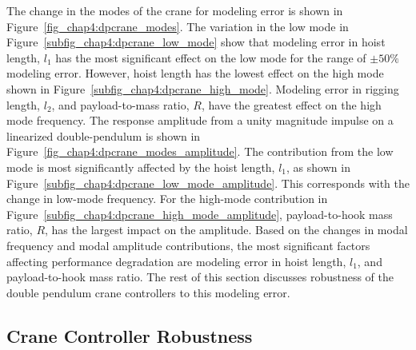The change in the modes of the crane for modeling error is shown in Figure~\ref{fig_chap4:dpcrane_modes}. The variation in the low mode in Figure~\ref{subfig_chap4:dpcrane_low_mode} show that modeling error in hoist length, $l_1$ has the most significant effect on the low mode for the range of $\pm 50 \%$ modeling error. However, hoist length has the lowest effect on the high mode shown in Figure~\ref{subfig_chap4:dpcrane_high_mode}. Modeling error in rigging length, $l_2$, and payload-to-mass ratio, $R$, have the greatest effect on the high mode frequency.
%
The response amplitude from a unity magnitude impulse on a linearized double-pendulum is shown in Figure~\ref{fig_chap4:dpcrane_modes_amplitude}. The contribution from the low mode is most significantly affected by the hoist length, $l_1$, as shown in Figure~\ref{subfig_chap4:dpcrane_low_mode_amplitude}. This corresponds with the change in low-mode frequency. For the high-mode contribution in Figure~\ref{subfig_chap4:dpcrane_high_mode_amplitude}, payload-to-hook mass ratio, $R$, has the largest impact on the amplitude. Based on the changes in modal frequency and modal amplitude contributions, the most significant factors affecting performance degradation are modeling error in hoist length, $l_1$, and payload-to-hook mass ratio. The rest of this section discusses robustness of the double pendulum crane controllers to this modeling error.
%


\subsection{Crane Controller Robustness}

